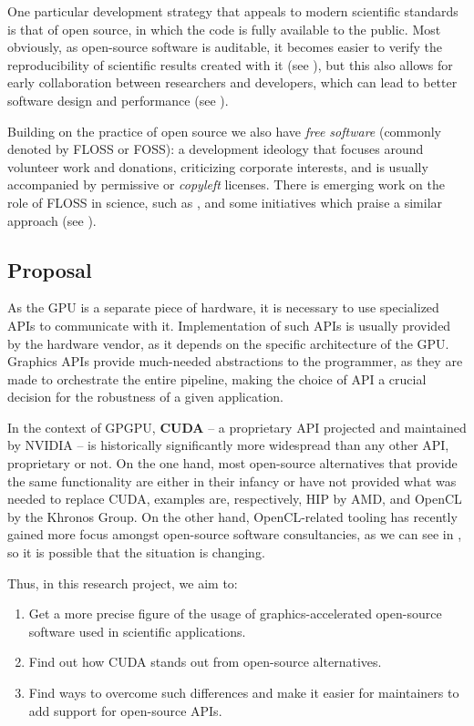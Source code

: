 \documentclass[12pt]{article}
\begin{document}
One particular development strategy that appeals to modern scientific standards
is that of open source, in which the code is fully available to the public.
Most obviously, as open-source software is auditable, it becomes easier to
verify the reproducibility of scientific results created with it (see
\cite{barba2022defining}), but this also allows for early collaboration between
researchers and developers, which can lead to better software design and
performance (see \cite{wilson2014best}).

Building on the practice of open source we also have \textit{free software}
(commonly denoted by FLOSS or FOSS): a development ideology that focuses around
volunteer work and donations, criticizing corporate interests, and is usually
accompanied by permissive or \textit{copyleft} licenses.
There is emerging work on the role of FLOSS in science, such as
\cite{fortunato2021case}, and some initiatives which praise a similar approach
(see \cite{katz2018community, barker2022introducing}).

\subsection{Proposal} \label{sec:intro:proposal}

As the GPU is a separate piece of hardware, it is necessary to use specialized
APIs to communicate with it.
Implementation of such APIs is usually provided by the hardware vendor, as it
depends on the specific architecture of the GPU.
Graphics APIs provide much-needed abstractions to the programmer, as they are
made to orchestrate the entire pipeline, making the choice of API a crucial
decision for the robustness of a given application.

In the context of GPGPU, \textbf{CUDA} -- a proprietary API
projected and maintained by NVIDIA -- is historically significantly more
widespread than any other API, proprietary or not.
On the one hand, most open-source alternatives that provide the same
functionality are either in their infancy or have not provided what was needed
to replace CUDA, examples are, respectively, HIP by AMD, and OpenCL by the
Khronos Group.
On the other hand, OpenCL-related tooling has recently gained more focus
amongst open-source software consultancies, as we can see in
\cite{Nicola_2022}, so it is possible that the situation is changing.

Thus, in this research project, we aim to:
\begin{enumerate}
    \item\label{obj1} Get a more precise figure of the usage of
        graphics-accelerated open-source software used in scientific
        applications.
    \item\label{obj2} Find out how CUDA stands out from open-source
      alternatives.
    \item\label{obj3} Find ways to overcome such differences and make it easier
        for maintainers to add support for open-source APIs.
\end{enumerate}
\end{document}
